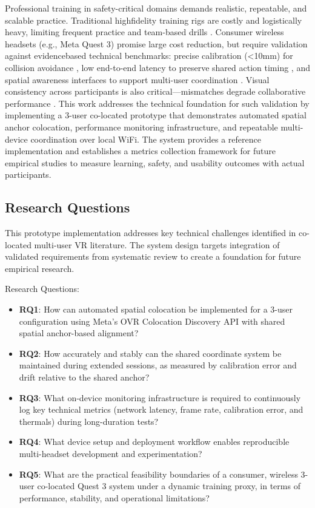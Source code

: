 Professional training in safety-critical domains demands realistic, repeatable, and scalable practice. Traditional highfidelity training rigs are costly and logistically heavy, limiting frequent practice and team-based drills \cite{SharmaSharad2025IASR}. Consumer wireless headsets (e.g., Meta Quest 3) promise large cost reduction, but require validation against evidencebased technical benchmarks: precise calibration (\textless10mm) for collision avoidance \cite{ReimerDennis2021CfSV}, low end-to-end latency to preserve shared action timing \cite{VanDammeSam2024Iolo}, and spatial awareness interfaces to support multi-user coordination \cite{ChenLei2024Eoep}. Visual consistency across participants is also critical—mismatches degrade collaborative performance \cite{WeissYannick2025ItEo}. This work addresses the technical foundation for such validation by implementing a 3-user co-located prototype that demonstrates automated spatial anchor colocation, performance monitoring infrastructure, and repeatable multi-device coordination over local WiFi. The system provides a reference implementation and establishes a metrics collection framework for future empirical studies to measure learning, safety, and usability outcomes with actual participants.

\subsection{Research Questions}
This prototype implementation addresses key technical challenges identified in co-located multi-user VR literature. The system design targets integration of validated requirements from systematic review to create a foundation for future empirical research.

Research Questions:
\begin{itemize}
    \item \textbf{RQ1}: How can automated spatial colocation be implemented for a 3-user configuration using Meta's OVR Colocation Discovery API with shared spatial anchor-based alignment?~\cite{MetaColocationDiscovery2025,MetaSharedSpatialAnchors2025}
    \item \textbf{RQ2}: How accurately and stably can the shared coordinate system be maintained during extended sessions, as measured by calibration error and drift relative to the shared anchor?
    \item \textbf{RQ3}: What on-device monitoring infrastructure is required to continuously log key technical metrics (network latency, frame rate, calibration error, and thermals) during long-duration tests?
    \item \textbf{RQ4}: What device setup and deployment workflow enables reproducible multi-headset development and experimentation?
    \item \textbf{RQ5}: What are the practical feasibility boundaries of a consumer, wireless 3-user co-located Quest 3 system under a dynamic training proxy, in terms of performance, stability, and operational limitations?
\end{itemize}